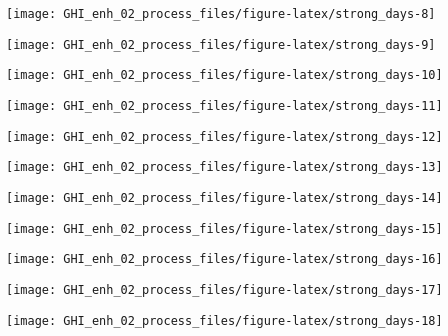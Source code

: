 \documentclass[
  10pt,
  a4paper,oneside]{article}
\begin{document}
\begin{center}\texttt{[image: GHI\_enh\_02\_process\_files/figure-latex/strong\_days-8]} \end{center}

\begin{center}\texttt{[image: GHI\_enh\_02\_process\_files/figure-latex/strong\_days-9]} \end{center}

\begin{center}\texttt{[image: GHI\_enh\_02\_process\_files/figure-latex/strong\_days-10]} \end{center}

\begin{center}\texttt{[image: GHI\_enh\_02\_process\_files/figure-latex/strong\_days-11]} \end{center}

\begin{center}\texttt{[image: GHI\_enh\_02\_process\_files/figure-latex/strong\_days-12]} \end{center}

\begin{center}\texttt{[image: GHI\_enh\_02\_process\_files/figure-latex/strong\_days-13]} \end{center}

\begin{center}\texttt{[image: GHI\_enh\_02\_process\_files/figure-latex/strong\_days-14]} \end{center}

\begin{center}\texttt{[image: GHI\_enh\_02\_process\_files/figure-latex/strong\_days-15]} \end{center}

\begin{center}\texttt{[image: GHI\_enh\_02\_process\_files/figure-latex/strong\_days-16]} \end{center}

\begin{center}\texttt{[image: GHI\_enh\_02\_process\_files/figure-latex/strong\_days-17]} \end{center}

\begin{center}\texttt{[image: GHI\_enh\_02\_process\_files/figure-latex/strong\_days-18]} \end{center}
\end{document}

